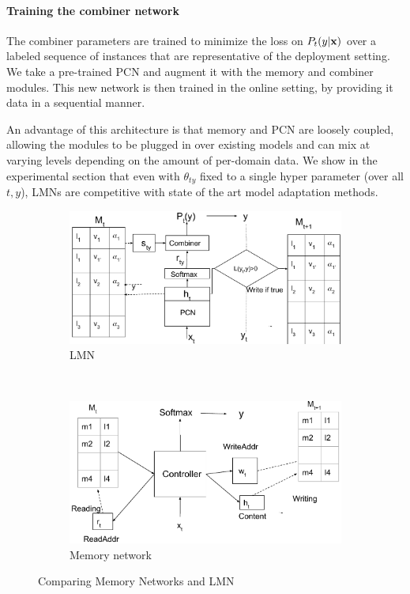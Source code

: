 \documentclass[letterpaper]{article} %
\newcommand{\vek}[1]{{\bf {#1}}}
\newcommand{\vx}{{\vek{x}}}
\newcommand{\rulesep}{\unskip\ \vrule\ }
\begin{document}
\paragraph{Training the combiner network} The combiner parameters are trained to minimize the loss on $P_t(y|\vx)$ over a labeled sequence of instances that are representative of the deployment setting.
We take a pre-trained PCN and augment it with the memory and combiner modules. This new network is then trained in the online setting, by providing it data in a sequential manner.

An advantage of this architecture is that memory and PCN are loosely coupled, allowing the modules to be plugged in over existing models and can mix at varying levels depending on the amount of per-domain data. We show in the experimental section that even with $\theta_{ty}$ fixed to a single hyper parameter (over all $t,y$), LMNs are competitive with state of the art model adaptation methods.


\begin{figure}
%
\begin{subfigure}[b]{0.5\textwidth}
\begin{center}
  \includegraphics[width=0.9\hsize]{lmn.pdf}
  \caption{LMN}
  \label{fig:lmn}
  \end{center}
 \end{subfigure}
 \rulesep
%
%
 \begin{subfigure}[b]{0.5\textwidth}
 \begin{center}
  \includegraphics[width=0.9\hsize]{mem_net.pdf}
  \caption{Memory network}
  \label{fig:mem_net}
  \end{center}
 \end{subfigure}
%
\caption{Comparing Memory Networks and LMN}
\label{fig:net_comparison}
\end{figure}
\end{document}
